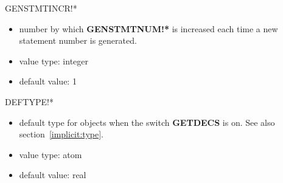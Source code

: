 \begin{describe}{GENSTMTINCR!*}
\begin{itemize}
\item number by which {\bf GENSTMTNUM!*} is increased each time a new
statement number is generated.
\item value type:  integer
\item default value:  1
\end{itemize}
\end{describe}
\begin{describe}{DEFTYPE!*}
\begin{itemize}
\item default type for objects when the switch {\bf GETDECS} is on.  See also
section~\ref{implicit:type}.
\item value type: atom
\item default value: real
\end{itemize}
\end{describe}

